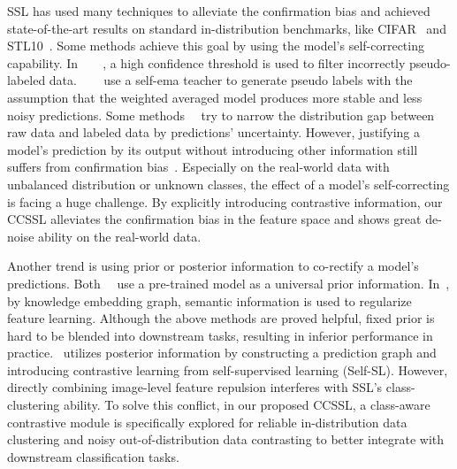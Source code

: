 \documentclass[10pt,twocolumn,letterpaper]{article}
\begin{document}
SSL has used many techniques to alleviate the confirmation bias and achieved state-of-the-art results on standard in-distribution benchmarks, like CIFAR~\cite{krizhevsky2009learning} and STL10~\cite{coates2011analysis}. Some methods achieve this goal by using the model's self-correcting capability. In~\cite{sohn2020fixmatch}~\cite{berthelot2019mixmatch}~\cite{berthelot2019remixmatch}~\cite{sohn2020fixmatch}, a high confidence threshold is used to filter incorrectly pseudo-labeled data. ~\cite{zhou2021instant}~\cite{liu2021unbiased}~\cite{tang2021humble} use a self-ema teacher to generate pseudo labels with the assumption that the weighted averaged model produces more stable and less noisy predictions. Some methods~\cite{taherkhani2021self}~\cite{wang2021data} try to narrow the distribution gap between raw data and labeled data by predictions' uncertainty. However, justifying a model's prediction by its output without introducing other information still suffers from confirmation bias~\cite{nassar2021labels}. Especially on the real-world data with unbalanced distribution or unknown classes, the effect of a model's self-correcting is facing a huge challenge. By explicitly introducing contrastive information, our CCSSL alleviates the confirmation bias in the feature space and shows great de-noise ability on the real-world data.

Another trend is using prior or posterior information to co-rectify a model's predictions. Both~\cite{he2020momentum}~\cite{chen2020simple} use a pre-trained model as a universal prior information. In~\cite{nassar2021labels}, by knowledge embedding graph, semantic information is used to regularize feature learning. Although the above methods are proved helpful, fixed prior is hard to be blended into downstream tasks, resulting in inferior performance in practice.~\cite{li2021comatch} utilizes posterior information by constructing a prediction graph and introducing contrastive learning from self-supervised learning (Self-SL). However, directly combining image-level feature repulsion interferes with SSL's class-clustering ability. To solve this conflict, in our proposed CCSSL, a class-aware contrastive module is specifically explored for reliable in-distribution data clustering and noisy out-of-distribution data contrasting to better integrate with downstream classification tasks. 
\end{document}
